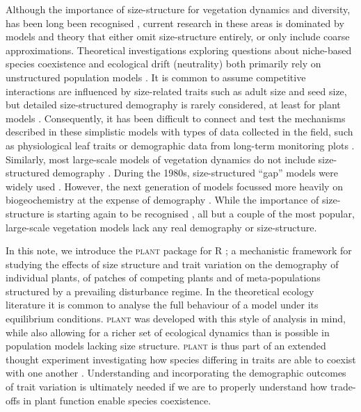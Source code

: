 \documentclass[a4paper,11pt]{article}
\newcommand{\plant}{\textsc{plant}}
\begin{document}
Although the importance of size-structure for vegetation dynamics and diversity, 
has been long been recognised
\citep[e.g.,][]{Harper-1977, Shugart-1980, Huston-1987}, current research in these
areas is dominated by models and theory that either omit size-structure 
entirely, or only include coarse approximations. Theoretical investigations 
exploring questions about niche-based species coexistence and ecological drift 
(neutrality) both primarily rely  on unstructured population models 
\citep[e.g.][]{MacArthur-1967, Tilman-1985, Geritz-1995, Hubbell-2001,
Calcagno-2006, Leimar-2013}. It is common to assume
competitive interactions are influenced by size-related traits such as
adult size and seed size, but detailed size-structured demography is
rarely considered, at least for plant models \cite[for animal
examples, see][]{Deroos-1988, Deroos-1992}. Consequently, it has been
difficult to connect and test the mechanisms described in these simplistic models
with types of data collected in the field, such as physiological
leaf traits or demographic data from long-term monitoring plots \citep{Adler-2013}.
Similarly, most large-scale models of vegetation dynamics do not include
size-structured demography \citep{Cramer-2001, Sitch-2003, Kelley-2013,Dekauwe-2014}. 
During the  1980s, size-structured ``gap'' models were widely used
\citep[e.g.][]{Shugart-1980,Huston-1987}. However, the next generation of models 
focussed more heavily on biogeochemistry at the expense of demography 
\citep[e.g.][]{Woodward-1995,Haxeltine-1996}. While the importance
of size-structure is starting again to be recognised \citep{Moorcroft-2001, 
 Falster-2011, Dekauwe-2014}, all but a couple \citep[e.g.][]{Moorcroft-2001, Smith-2014} 
of the most popular, large-scale vegetation models lack any real demography or 
size-structure. 

In this note, we introduce the {\plant} package for R \citep{R-2015};
a mechanistic framework for studying the effects of size structure and
trait variation on the demography of individual plants, of patches of
competing plants and of meta-populations structured by a prevailing
disturbance regime. In the theoretical ecology literature it is common to
analyse the full behaviour of a model under its equilibrium conditions.
{\plant} was developed with this style of analysis in mind, while also 
allowing for a richer set of ecological dynamics than is possible in 
population models lacking size structure. {\plant} is thus part
of an extended thought experiment investigating how species differing
in traits are able to coexist with one another \citep{Falster-2011,Falster-2015}.
Understanding and incorporating the demographic outcomes of trait variation 
is ultimately needed if we are to properly understand how trade-offs in plant function 
enable species coexistence.
\end{document}
